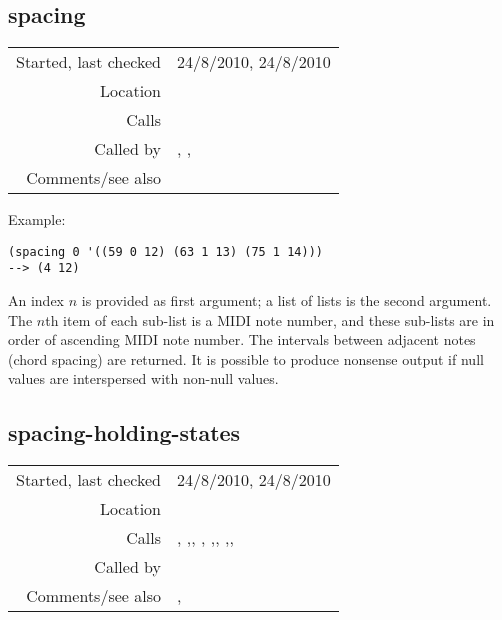 \subsection*{spacing}\label{fun:spacing}

\vspace{0.3cm}
\begin{tabular}{r|p{8cm}}
Started, last checked & 24/8/2010, 24/8/2010 \\
Location & \nameref{sec:spacing-states} \\
Calls & \\
Called by & \nameref{fun:beat-spacing-states}, \nameref{fun:beat-spacing-states<-},\newline \nameref{fun:spacing-holding-states} \\
Comments/see also & \nameref{fun:intervals-above-bass}
\end{tabular}

\vspace{0.5cm}
\noindent Example:
\begin{verbatim}
(spacing 0 '((59 0 12) (63 1 13) (75 1 14)))
--> (4 12)
\end{verbatim}

\noindent An index $n$ is provided as first argument;
a list of lists is the second argument. The $n$th item
of each sub-list is a MIDI note number, and these sub-lists are in order of ascending MIDI note number. The
intervals between adjacent notes (chord spacing) are
returned. It is possible to produce nonsense output
if null values are interspersed with non-null
values.


\subsection*{spacing-holding-states}\label{fun:spacing-holding-states}

\vspace{0.3cm}
\begin{tabular}{r|p{8cm}}
Started, last checked & 24/8/2010, 24/8/2010 \\
Location & \nameref{sec:spacing-states} \\
Calls & \nameref{fun:append-offtimes}, \nameref{fun:bass-steps},\newline \nameref{fun:enumerate-append}, \nameref{fun:index-rests}, \nameref{fun:nth-list},\newline \nameref{fun:nth-list-of-lists}, \nameref{fun:remove-nth-list},\newline \nameref{fun:sort-holding-types}, \nameref{fun:spacing} \\
Called by & \\
Comments/see also & \nameref{fun:beat-spacing-states}, \nameref{fun:beat-spacing-states<-}
\end{tabular}

